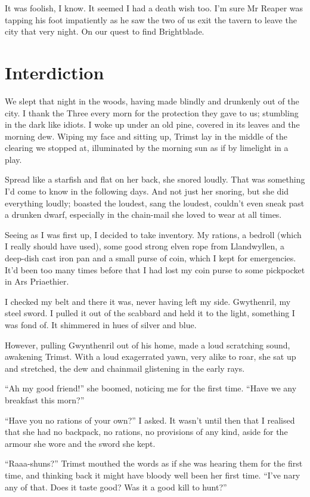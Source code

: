 \documentclass[12pt, a4paper]{book}
\begin{document}
It was foolish, I know. It seemed I had a death wish too. I'm sure Mr Reaper was tapping his foot impatiently as he saw the two of us exit the tavern to leave the city that very night. On our quest to find Brightblade.

\chapter{Interdiction}
We slept that night in the woods, having made blindly and drunkenly out of the city. I thank the Three every morn for the protection they gave to us; stumbling in the dark like idiots. I woke up under an old pine, covered in its leaves and the morning dew. Wiping my face and sitting up, Trimst lay in the middle of the clearing we stopped at, illuminated by the morning sun as if by limelight in a play.

Spread like a starfish and flat on her back, she snored loudly. That was something I'd come to know in the following days. And not just her snoring, but she did everything loudly; boasted the loudest, sang the loudest, couldn't even sneak past a drunken dwarf, especially in the chain-mail she loved to wear at all times.

Seeing as I was first up, I decided to take inventory. My rations, a bedroll (which I really should have used), some good strong elven rope from Llandwyllen, a deep-dish cast iron pan and a small purse of coin, which I kept for emergencies. It'd been too many times before that I had lost my coin purse to some pickpocket in Ars Priaethier.

I checked my belt and there it was, never having left my side. Gwythenril, my steel sword. I pulled it out of the scabbard and held it to the light, something I was fond of. It shimmered in hues of silver and blue.

However, pulling Gwynthenril out of his home, made a loud scratching sound, awakening Trimst. With a loud exagerrated yawn, very alike to roar, she sat up and stretched, the dew and chainmail glistening in the early rays.

``Ah my good friend!'' she boomed, noticing me for the first time. ``Have we any breakfast this morn?''

``Have you no rations of your own?'' I asked. It wasn't until then that I realised that she had no backpack, no rations, no provisions of any kind, aside for the armour she wore and the sword she kept.

``Raaa-shuns?'' Trimst mouthed the words as if she was hearing them for the first time, and thinking back it might have bloody well been her first time. ``I've nary any of that. Does it taste good? Was it a good kill to hunt?''
\end{document}
